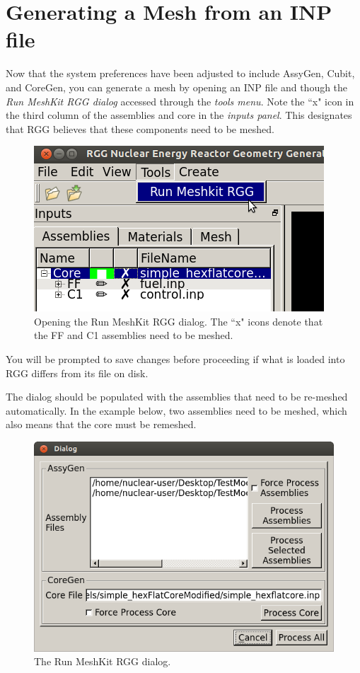 \section{Generating a Mesh from an INP file}

Now that the system preferences have been adjusted to include AssyGen, Cubit, and CoreGen, you can generate a mesh by opening an INP file and though the \emph{Run MeshKit RGG dialog} accessed through the \emph{tools menu}.  Note the ``x" icon in the third column of the assemblies and core in the \emph{inputs panel}.  This designates that RGG believes that these components need to be meshed.

\begin{figure}[H]
	\begin{center}
		\includegraphics[width=0.5\linewidth]{Images/mesh-3.png}
		\caption{Opening the Run MeshKit RGG dialog.  The ``x" icons denote that the FF and C1 assemblies need to be meshed.}
		\label{fig:Mesh3}
	\end{center}
\end{figure}

You will be prompted to save changes before proceeding if what is loaded into RGG differs from its file on disk.

The dialog should be populated with the assemblies that need to be re-meshed automatically.  In the example below, two assemblies need to be meshed, which also means that the core must be remeshed.

\begin{figure}[H]
	\begin{center}
		\includegraphics[width=0.5\linewidth]{Images/mesh-4.png}
		\caption{The Run MeshKit RGG dialog.}
		\label{fig:Mesh4}
	\end{center}
\end{figure}

